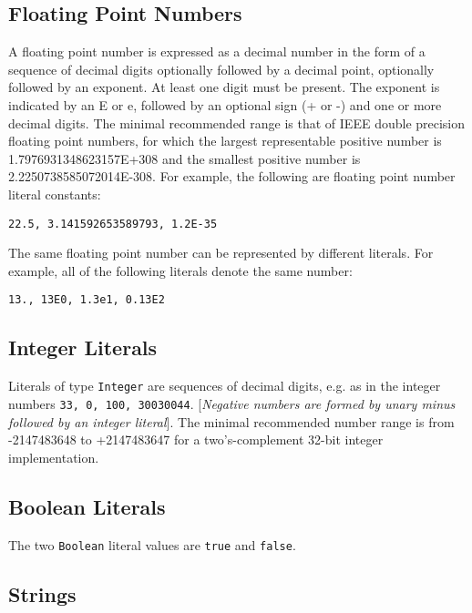 \subsection{Floating Point Numbers}

A floating point number is expressed as a decimal number in the form of
a sequence of decimal digits optionally followed by a decimal point,
optionally followed by an exponent. At least one digit must be present.
The exponent is indicated by an E or e, followed by an optional sign (+
or -) and one or more decimal digits. The minimal recommended range is
that of IEEE double precision floating point numbers, for which the
largest representable positive number is 1.7976931348623157E+308 and the
smallest positive number is 2.2250738585072014E-308. For example, the
following are floating point number literal constants:

\begin{lstlisting}[language=modelica]
22.5, 3.141592653589793, 1.2E-35
\end{lstlisting}

The same floating point number can be represented by different literals.
For example, all of the following literals denote the same number:

\begin{lstlisting}[language=modelica]
13., 13E0, 1.3e1, 0.13E2
\end{lstlisting}

\subsection{Integer Literals}

Literals of type \lstinline!Integer! are sequences of decimal digits, e.g. as in the
integer numbers \lstinline!33, 0, 100, 30030044!. {[}\emph{Negative numbers are
formed by unary minus followed by an integer literal}{]}. The minimal
recommended number range is from -2147483648 to +2147483647 for a
two's-complement 32-bit integer implementation.

\subsection{Boolean Literals}

The two \lstinline!Boolean! literal values are \lstinline!true! and \lstinline!false!.

\subsection{Strings}

